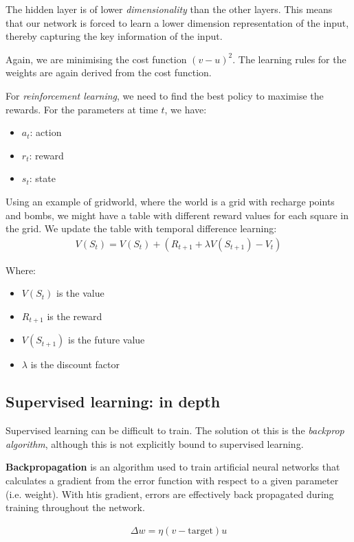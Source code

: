 \documentclass[11pt,a4paper,titlepage,dvipsnames,cmyk]{scrartcl}
\begin{document}
The hidden layer is of lower \textit{dimensionality} than the other layers. This means that our network is forced to learn a lower dimension representation of the input, thereby capturing the key information of the input.

Again, we are minimising the cost function $(v-u)^2$. The learning rules for the weights are again derived from the cost function.

For \textit{reinforcement learning}, we need to find the best policy to maximise the rewards. For the parameters at time $t$, we have:
\begin{itemize}
    \item $a_t$: action
    \item $r_t$: reward
    \item $s_t$: state
\end{itemize}

Using an example of gridworld, where the world is a grid with recharge points and bombs, we might have a table with different reward values for each square in the grid. We update the table with temporal difference learning:
\begin{align*}
V(S_t) = V(S_t) + (R_{t+1} + \lambda V(S_{t+1}) - V_t)
\end{align*}

Where:
\begin{itemize}
    \item $V(S_t)$ is the value
    \item $R_{t+1}$ is the reward
    \item $V(S_{t+1})$ is the future value
    \item $\lambda$ is the discount factor
\end{itemize}

\subsection{Supervised learning: in depth}
Supervised learning can be difficult to train. The solution ot this is the \textit{backprop algorithm}, although this is not explicitly bound to supervised learning.

\textbf{Backpropagation} is an algorithm used to train artificial neural networks that calculates a gradient from the error function with respect to a given parameter (i.e. weight). With htis gradient, errors are effectively back propagated during training throughout the network.

\begin{align*}
\Delta w = \eta (v-\text{target})u
\end{align*}
\end{document}
